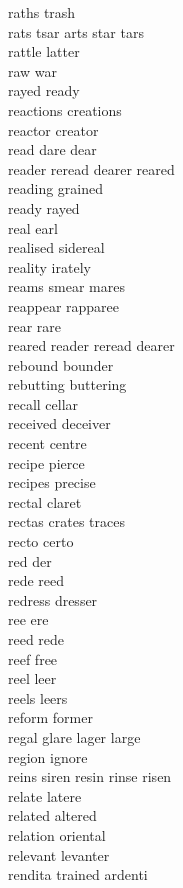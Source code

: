 raths trash\\
rats tsar arts star tars\\
rattle latter\\
raw war\\
rayed ready\\
reactions creations\\
reactor creator\\
read dare dear\\
reader reread dearer reared\\
reading grained\\
ready rayed\\
real earl\\
realised sidereal\\
reality irately\\
reams smear mares\\
reappear rapparee\\
rear rare\\
reared reader reread dearer\\
rebound bounder\\
rebutting buttering\\
recall cellar\\
received deceiver\\
recent centre\\
recipe pierce\\
recipes precise\\
rectal claret\\
rectas crates traces\\
recto certo\\
red der\\
rede reed\\
redress dresser\\
ree ere\\
reed rede\\
reef free\\
reel leer\\
reels leers\\
reform former\\
regal glare lager large\\
region ignore\\
reins siren resin rinse risen\\
relate latere\\
related altered\\
relation oriental\\
relevant levanter\\
rendita trained ardenti\\
